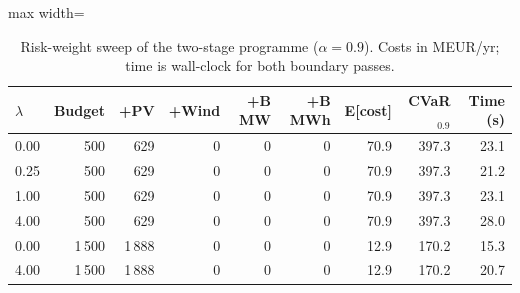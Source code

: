 \begin{table}[htbp]
\centering
\footnotesize
\caption{Risk-weight sweep of the two-stage programme ($\alpha=0.9$). Costs in MEUR/yr; time is wall-clock for both boundary passes.}
\label{tab:risk-sweep}
\begin{adjustbox}{max width=\linewidth}
\begin{tabular}{lrrrrrrrr}
\toprule
$\lambda$ & Budget & +PV & +Wind & +B MW & +B MWh & E[cost] & CVaR$_{0.9}$ & Time (s) \\
\midrule
0.00 & 500 & 629 & 0 & 0 & 0 & 70.9 & 397.3 & 23.1 \\
0.25 & 500 & 629 & 0 & 0 & 0 & 70.9 & 397.3 & 21.2 \\
1.00 & 500 & 629 & 0 & 0 & 0 & 70.9 & 397.3 & 23.1 \\
4.00 & 500 & 629 & 0 & 0 & 0 & 70.9 & 397.3 & 28.0 \\
0.00 & 1\,500 & 1\,888 & 0 & 0 & 0 & 12.9 & 170.2 & 15.3 \\
4.00 & 1\,500 & 1\,888 & 0 & 0 & 0 & 12.9 & 170.2 & 20.7 \\
\bottomrule
\end{tabular}
\end{adjustbox}
\end{table}
